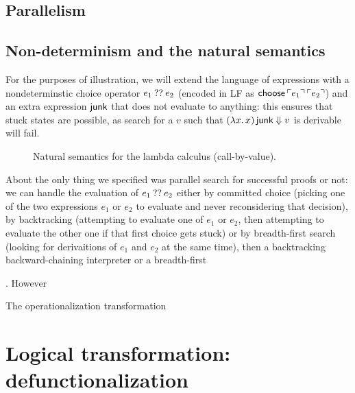 \subsection{Parallelism}
\label{sec:trans-par}

\subsection{Non-determinism and the natural semantics}

For the purposes of illustration, we will extend the language of
expressions with a nondeterminstic choice operator $e_1 \mathbin{??} e_2$
(encoded in LF as ${\sf choose}\,{\ulcorner{e_1}\urcorner}\,{\ulcorner{e_2}\urcorner}$) and an
extra expression ${\sf junk}$ that does not evaluate to anything: this
ensures that stuck states are possible, as search for a $v$ such that
$(\lambda x.\,x)\,{\sf junk} \Downarrow v$ is derivable will fail.

\begin{figure}[t]
\begin{minipage}[b]{0.45\linewidth}
\end{minipage}
\hspace{0.5cm}
\begin{minipage}[b]{0.55\linewidth}
\end{minipage}
\caption{Natural semantics for the lambda calculus (call-by-value).}
\label{fig:ns-arb}
\end{figure}

About the only thing we specified was parallel search for successful
proofs or not: we can handle the evaluation of $e_1 \mathbin{??} e_2$ either
by committed choice (picking one of the two expressions $e_1$ or $e_2$
to evaluate and never reconsidering that decision), by backtracking
(attempting to evaluate one of $e_1$ or $e_2$, then attempting to
evaluate the other one if that first choice gets stuck) or by
breadth-first search (looking for derivaitions of $e_1$ and $e_2$ at
the same time), then a backtracking backward-chaining interpreter or a
breadth-first

. However

The operationalization transformation 



\section{Logical transformation: defunctionalization}
\label{sec:defunctionalization}


